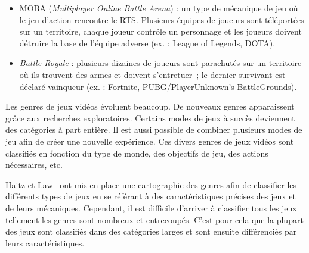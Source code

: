 \begin{itemize}
    \item MOBA (\emph{Multiplayer Online Battle Arena}) : un type de mécanique de jeu o\`u le jeu d'action rencontre le RTS. Plusieurs équipes de joueurs sont téléportées sur un territoire, chaque joueur contrôle un personnage et les joueurs doivent détruire la base de l'équipe adverse (ex. : League of Legends, DOTA).
    \item \emph{Battle Royale} : plusieurs dizaines de joueurs sont parachutés sur un territoire o\`u ils trouvent des armes et doivent s'entretuer~; le dernier survivant est déclaré vainqueur (ex. : Fortnite, PUBG/PlayerUnknown's BattleGrounds).
\end{itemize}

Les genres de jeux vidéos évoluent beaucoup.
De nouveaux genres apparaissent grâce aux recherches exploratoires.
Certains modes de jeux à succès deviennent des catégories à part entière.
Il est aussi possible de combiner plusieurs modes de jeu afin de créer une nouvelle expérience.
Ces divers genres de jeux vidéos sont classifiés en fonction du type de monde, des objectifs de jeu, des actions nécessaires, etc. 

Haitz et Law~\cite{HeintzStephanie2015TGGM} ont mis en place une cartographie des genres afin de classifier les différents types de jeux en se référant à des caractéristiques précises des jeux et de leurs mécaniques.
Cependant, il est difficile d'arriver à classifier tous les jeux tellement les genres sont nombreux et entrecoupés.
C'est pour cela que la plupart des jeux sont classifiés dans des catégories larges et sont ensuite différenciés par leurs caractéristiques.

